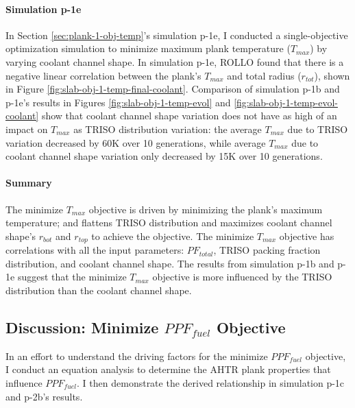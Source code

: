 \paragraph{Simulation p-1e}
In Section \ref{sec:plank-1-obj-temp}'s simulation p-1e, I conducted a single-objective 
optimization simulation to minimize maximum plank temperature ($T_{max}$) by varying 
coolant channel shape. 
In simulation p-1e, \gls{ROLLO} found that there is a negative linear correlation 
between the plank's $T_{max}$ and total radius ($r_{tot}$), shown in 
Figure \ref{fig:slab-obj-1-temp-final-coolant}. 
Comparison of simulation p-1b and p-1e's results in 
Figures \ref{fig:slab-obj-1-temp-evol} and \ref{fig:slab-obj-1-temp-evol-coolant} 
show that coolant channel shape variation does not have as high of an impact on 
$T_{max}$ as \gls{TRISO} distribution variation: the average $T_{max}$ due to 
\gls{TRISO} variation decreased by 60K over 10 generations, while average $T_{max}$ due 
to coolant channel shape variation only decreased by 15K over 10 generations. 

\paragraph{Summary}
The minimize $T_{max}$ objective is driven by minimizing the plank's maximum temperature; 
and flattens TRISO distribution and maximizes coolant channel shape's 
$r_{bot}$ and $r_{top}$ to achieve the objective. 
The minimize $T_{max}$ objective has correlations with all the input parameters: 
$PF_{total}$, TRISO packing fraction distribution, and coolant channel shape. 
The results from simulation p-1b and p-1e suggest that the minimize $T_{max}$ objective 
is more influenced by the TRISO distribution than the coolant channel shape. 

\subsection{Discussion: Minimize $PPF_{fuel}$ Objective}
\label{sec:plank-discussion-ppf}
In an effort to understand the driving factors for the minimize $PPF_{fuel}$ 
objective, I conduct an equation analysis to determine the \gls{AHTR} plank properties 
that influence $PPF_{fuel}$. 
I then demonstrate the derived relationship in simulation p-1c and p-2b's results. 

